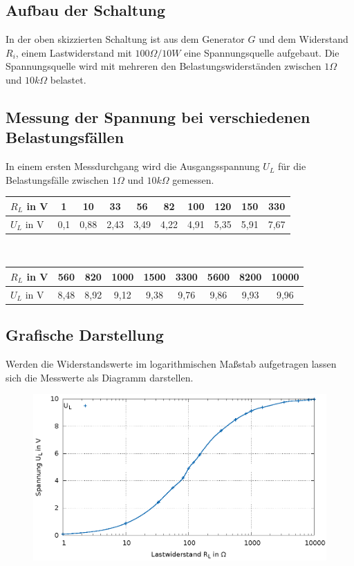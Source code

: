 \documentclass[
a4paper,     %
 headsepline, %
11pt         %
]{scrartcl}  %
\begin{document}
\subsection{Aufbau der Schaltung}

In der oben skizzierten Schaltung ist aus dem Generator $G$ und dem Widerstand $R_i$, einem Lastwiderstand mit $100\Omega/10W$ eine Spannungsquelle aufgebaut.
Die Spannungsquelle wird mit mehreren den Belastungswiderständen zwischen $1\Omega$ und $10k\Omega$ belastet.

\newpage
\subsection{Messung der Spannung bei verschiedenen Belastungsfällen}

In einem ersten Messdurchgang wird die Ausgangsspannung $U_L$ für die Belastungsfälle zwischen $1\Omega$ und $10k\Omega$ gemessen.

\begin{flushleft}
\begin{tabular}{ l | c | c | c | c | c | c | c | c | c  }
    \hline
    $R_L$ in V  & 1    & 10   & 33   & 56   & 82   & 100  & 120  & 150  & 330         \\ \hline
    $U_L$ in V  & 0,1  & 0,88 & 2,43 & 3,49 & 4,22 & 4,91 & 5,35 & 5,91 & 7,67      \\
    \hline
\end{tabular} \\
\begin{tabular}{ l | c | c | c | c | c | c | c | c }
    \hline
    $R_L$ in V  & 560  & 820  & 1000  & 1500 & 3300 & 5600  & 8200  & 10000   \\ \hline
    $U_L$ in V  & 8,48 & 8,92 & 9,12  & 9,38 & 9,76 & 9,86  & 9,93  & 9,96    \\
    \hline
\end{tabular}
\end{flushleft}

\subsection{Grafische Darstellung}
Werden die Widerstandswerte im logarithmischen Maßstab aufgetragen lassen sich die Messwerte als Diagramm darstellen.

\begin{figure}[hbtp]
\centering
\includegraphics[scale=1]{diagramm_spannung.eps}
\end{figure}
\end{document}
